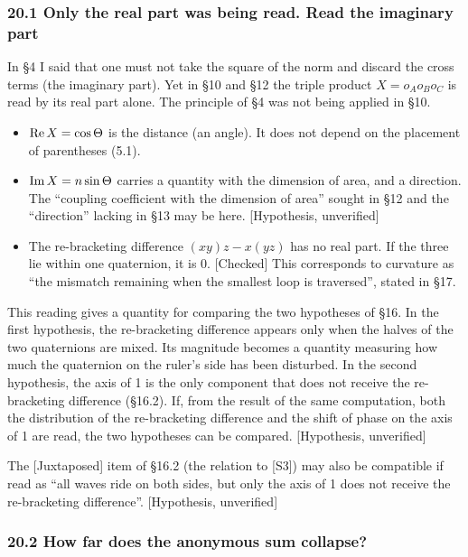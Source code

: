 \documentclass[
  a4paper,
]{article}
\providecommand{\tightlist}{%
  \setlength{\itemsep}{0pt}\setlength{\parskip}{0pt}}
\begin{document}
\subsubsection{20.1 Only the real part was being read. Read the
imaginary
part}\label{only-the-real-part-was-being-read.-read-the-imaginary-part}

In §4 I said that one must not take the square of the norm and discard
the cross terms (the imaginary part). Yet in §10 and §12 the triple
product \(X = o_Ao_Bo_C\) is read by its real part alone. The principle
of §4 was not being applied in §10.

\begin{itemize}
\tightlist
\item
  \({\rm Re}\,X = \cos\Theta\) is the distance (an angle). It does not
  depend on the placement of parentheses (5.1).
\item
  \({\rm Im}\,X = n\sin\Theta\) carries a quantity with the dimension of
  area, and a direction. The ``coupling coefficient with the dimension
  of area'' sought in §12 and the ``direction'' lacking in §13 may be
  here. {[}Hypothesis, unverified{]}
\item
  The re-bracketing difference \((xy)z - x(yz)\) has no real part. If
  the three lie within one quaternion, it is 0. {[}Checked{]} This
  corresponds to curvature as ``the mismatch remaining when the smallest
  loop is traversed'', stated in §17.
\end{itemize}

This reading gives a quantity for comparing the two hypotheses of §16.
In the first hypothesis, the re-bracketing difference appears only when
the halves of the two quaternions are mixed. Its magnitude becomes a
quantity measuring how much the quaternion on the ruler's side has been
disturbed. In the second hypothesis, the axis of 1 is the only component
that does not receive the re-bracketing difference (§16.2). If, from the
result of the same computation, both the distribution of the
re-bracketing difference and the shift of phase on the axis of 1 are
read, the two hypotheses can be compared. {[}Hypothesis, unverified{]}

The {[}Juxtaposed{]} item of §16.2 (the relation to {[}S3{]}) may also
be compatible if read as ``all waves ride on both sides, but only the
axis of 1 does not receive the re-bracketing difference''.
{[}Hypothesis, unverified{]}

\subsubsection{20.2 How far does the anonymous sum
collapse?}\label{how-far-does-the-anonymous-sum-collapse}
\end{document}
